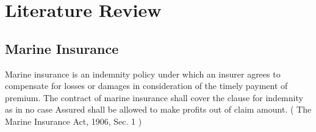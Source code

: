 \setlength{\footskip}{8mm}

\chapter{Literature Review} 
\label{ch:literature-review}



\section{Marine Insurance}

Marine insurance is an indemnity policy under which an insurer agrees to compensate for losses or damages in consideration of the timely payment of premium. The contract of marine insurance shall cover the clause for indemnity as in no case Assured shall be allowed to make profits out of claim amount. ( The Marine Insurance Act, 1906, Sec. 1 )




